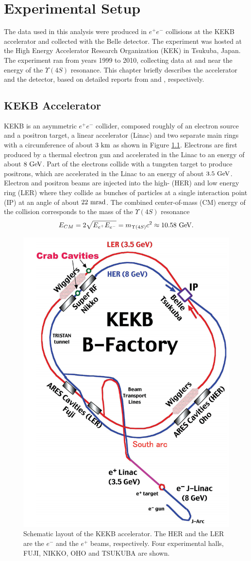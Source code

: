 \chapter{Experimental Setup}
The data used in this analysis were produced in $e^+e^-$ collisions at the KEKB accelerator and collected with the Belle detector. The experiment was hosted at the High Energy Accelerator Research Organization (KEK) in Tsukuba, Japan. The experiment ran
from years 1999 to 2010, collecting data at and near the energy of the $\Upsilon(4S)$ resonance. This chapter briefly describes the accelerator and the detector, based on detailed reports from \cite{doi:10.1093/ptep/pts102} and \cite{ABASHIAN2002117}, respectively.


\section{KEKB Accelerator}
KEKB is an asymmetric $e^+e^-$ collider, composed roughly of an electron source and a positron target, a linear accelerator (Linac) and two separate main rings with a circumference of about $3\mathrm{~km}$ as shown in Figure \ref{fig:kekb}. Electrons are first produced by a thermal electron gun and accelerated in the Linac to an energy of about $8\mathrm{~GeV}$. Part of the electrons collide with a tungsten target to produce positrons, which are accelerated in the Linac to an energy of about $3.5\mathrm{~GeV}$. Electron and positron beams are injected into the high- (HER) and low energy ring (LER) where they collide as bunches of particles at a single interaction point (IP) at an angle of about $22\mathrm{~mrad}$. The combined center-of-mass (CM) energy of the collision corresponds to the mass of the $\Upsilon(4S)$ resonance
\begin{equation}
E_{CM} = 2\sqrt{E_{e^+}E_{e^-}} = m_{\Upsilon(4S)}c^2 \approx 10.58\mathrm{~GeV}.
\end{equation}

\begin{figure}[H]
	\centering
	\captionsetup{width=0.8\linewidth}
	\includegraphics[width=0.5\linewidth]{fig/setup/KEKB}
	\caption{Schematic layout of the KEKB accelerator. The HER and the LER are the $e^-$ and the $e^+$ beams, respectively. Four experimental halls, FUJI, NIKKO, OHO and TSUKUBA are shown.}
	\label{fig:kekb}
\end{figure}

